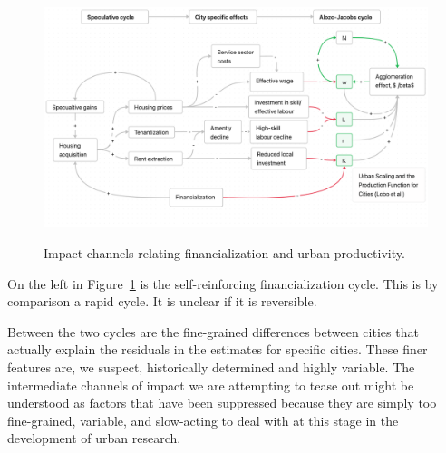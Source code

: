 {\newpage\thispagestyle{empty}
\vspace{-1.5cm}
\begin{figure}
\vspace{-1cm}
\begin{adjustwidth}{-0.24\textwidth}{-0.24\textwidth}
    \centering
    \includegraphics[scale=.35, angle=90]{fig/impact_channels.png}
    \label{fig-impact-channels}
\end{adjustwidth}
\caption{Impact channels relating financialization and urban productivity.}
\end{figure}
}


 
 
 On the left in Figure~\ref{fig-impact-channels} is the self-reinforcing %
 financialization cycle. This is by comparison a rapid cycle. It is unclear if it is reversible. 
 
 Between the two cycles are the fine-grained differences between cities that actually explain the residuals in the estimates for specific cities. These finer features are, we suspect, historically determined and highly variable. 
The intermediate channels of impact we are attempting to tease out %
might be understood as factors that have been suppressed because they are simply too fine-grained, variable, and slow-acting  to deal with at this stage in the development of urban research.

